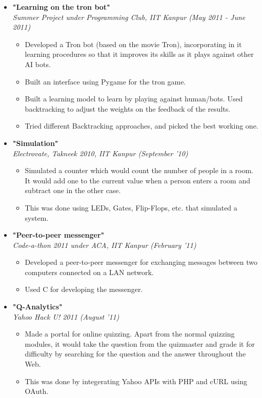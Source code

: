 \documentclass[margin,line]{resume}
\begin{document}
\begin{resume}
\begin{itemize}
\begin{itemize}
    \end{itemize}

  \item \large{\textbf{\textsf{"Learning on the tron bot"}}}
    \\ \small{\textit{Summer Project under Programming Club, IIT Kanpur (May 2011 - June 2011)}}
    \normalsize
    \begin{itemize}
    \item Developed a Tron bot (based on the movie Tron), incorporating in it learning procedures so that it improves its skills as it plays against other AI bots.
    \item Built an interface using Pygame for the tron game.
    \item Built a learning model to learn by playing against human/bots. Used backtracking to adjust the weights on the feedback of the results.
    \item Tried different Backtracking approaches, and picked the best working one.
    \end{itemize}

  \item \large{\textbf{\textsf{"Simulation"}}}
    \\ \small{\textit{Electrovate, Takneek 2010, IIT Kanpur (September '10)}}
    \normalsize
    \begin{itemize}
    \item Simulated a counter which would count the number of people in a room. It would add one to the current value when a person enters a room and subtract one in the other case.
    \item This was done using LEDs, Gates, Flip-Flops, etc. that simulated a system.
    \end{itemize}

  \item \large{\textbf{\textsf{"Peer-to-peer messenger"}}}
    \\ \small{\textit{Code-a-thon 2011 under ACA, IIT Kanpur (February '11)}}
    \normalsize
    \begin{itemize}
    \item Developed a peer-to-peer messenger for exchanging messages between two computers connected on a LAN network.
    \item Used C for developing the messenger.
    \end{itemize}

  \item \large{\textbf{\textsf{"Q-Analytics"}}}
    \\ \small{\textit{Yahoo Hack U! 2011 (August '11)}}
    \normalsize
    \begin{itemize}
    \item Made a portal for online quizzing. Apart from the normal quizzing modules, it would take the question from the quizmaster and grade it for difficulty by searching for the question and the answer throughout the Web.
    \item This was done by integerating Yahoo APIs with PHP and cURL using OAuth.
    \end{itemize}


\end{itemize}
\end{resume}
\end{document}
